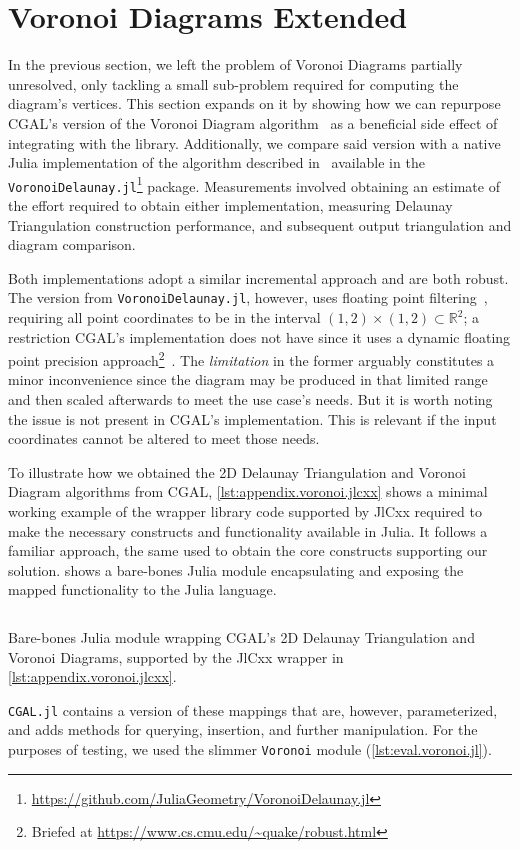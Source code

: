 \section{Voronoi Diagrams Extended}%
\label{sec:eval.voronoi}

In the previous section, we left the problem of Voronoi Diagrams partially
unresolved, only tackling a small sub-problem required for computing the
diagram's vertices.  This section expands on it by showing how we can repurpose
\ac{CGAL}'s version of the Voronoi Diagram algorithm~\cite{CGAL:5.3:VDA2} as a
beneficial side effect of integrating with the library.  Additionally, we
compare said version with a native Julia implementation of the algorithm
described in~\cite{Springel:2010:GCHSMM} available in the
\texttt{VoronoiDelaunay.jl}\footnote{\url{https://github.com/JuliaGeometry/VoronoiDelaunay.jl}}
package.  Measurements involved obtaining an estimate of the effort required to
obtain either implementation, measuring Delaunay Triangulation construction
performance, and subsequent output triangulation and diagram comparison.

Both implementations adopt a similar incremental approach and are both robust.
The version from \texttt{VoronoiDelaunay.jl}, however, uses floating point
filtering~\cite{Springel:2010:GCHSMM}, requiring all point coordinates to be in
the interval $\left(1, 2\right) \times \left(1, 2\right) \subset \mathbb{R}^2$;
a restriction \ac{CGAL}'s implementation does not have since it uses a dynamic
floating point precision approach\footnote{Briefed at
\url{https://www.cs.cmu.edu/~quake/robust.html}}~\cite{Shewchuk:1997:APFPAFRGP}.
The \textit{limitation} in the former arguably constitutes a minor inconvenience
since the diagram may be produced in that limited range and then scaled
afterwards to meet the use case's needs.  But it is worth noting the issue is
not present in \ac{CGAL}'s implementation.  This is relevant if the input
coordinates cannot be altered to meet those needs.

To illustrate how we obtained the 2D Delaunay Triangulation and Voronoi Diagram
algorithms from \ac{CGAL}, \cref{lst:appendix.voronoi.jlcxx} shows a minimal
working example of the wrapper library code supported by JlCxx required to make
the necessary constructs and functionality available in Julia.  It follows a
familiar approach, the same used to obtain the core constructs supporting our
\primitives{} solution.   shows a bare-bones Julia
module encapsulating and exposing the mapped functionality to the Julia
language.
\begin{listing}[htb]
  \inputminted{julia}{jl/Voronoi.jl}
  \caption[Bare-bones Julia module wrapping CGAL's Delaunay algorithms]{
    Bare-bones Julia module wrapping \ac{CGAL}'s 2D Delaunay Triangulation and
    Voronoi Diagrams, supported by the JlCxx wrapper in
    \cref{lst:appendix.voronoi.jlcxx}.}%
  \label{lst:eval.voronoi.jl}
\end{listing}
\texttt{CGAL.jl} contains a version of these mappings that are, however,
parameterized, and adds methods for querying, insertion, and further
manipulation.  For the purposes of testing, we used the slimmer \texttt{Voronoi}
module (\cref{lst:eval.voronoi.jl}).

